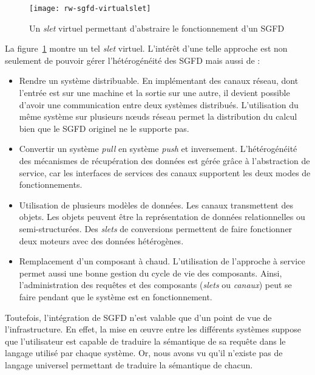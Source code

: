\begin{figure}[ht]
    \centering
    \texttt{[image: rw-sgfd-virtualslet]}
    \caption{Un \textit{slet} virtuel permettant d'abstraire le fonctionnement d'un SGFD}\label{fig:rw:sgfd:virtualslet}
\end{figure}
La figure~\ref{fig:rw:sgfd:virtualslet} montre un tel \textit{slet} virtuel. L'intérêt d'une telle approche est non seulement de pouvoir gérer l'hétérogénéité des SGFD mais aussi de :
\begin{itemize}
	\item Rendre un système distribuable. En implémentant des canaux réseau, dont l'entrée est sur une machine et la sortie sur une autre, il devient possible d'avoir une communication entre deux systèmes distribués. L'utilisation du même système sur plusieurs nœuds réseau permet la distribution du calcul bien que le SGFD originel ne le supporte pas.
	\item Convertir un système \textit{pull} en système \textit{push} et inversement. L'hétérogénéité des mécanismes de récupération des données est gérée grâce à l'abstraction de service, car les interfaces de services des canaux supportent les deux modes de fonctionnements.
	\item Utilisation de plusieurs modèles de données. Les canaux transmettent des objets. Les objets peuvent être la représentation de données relationnelles ou semi-structurées. Des \textit{slets} de conversions permettent de faire fonctionner deux moteurs avec des données hétérogènes.
	\item Remplacement d'un composant à chaud. L'utilisation de l'approche à service permet aussi une bonne gestion du cycle de vie des composants. Ainsi, l'administration des requêtes et des composants (\textit{slets} ou \textit{canaux}) peut se faire pendant que le système est en fonctionnement.
\end{itemize}

Toutefois, l'intégration de SGFD n'est valable que d'un point de vue de l'infrastructure. En effet, la mise en œuvre entre les différents systèmes suppose que l'utilisateur est capable de traduire la sémantique de sa requête dans le langage utilisé par chaque système. Or, nous avons vu qu'il n'existe pas de langage universel permettant de traduire la sémantique de chacun.

